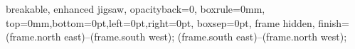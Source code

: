 
\usepackage[english]{babel}
\usepackage{lipsum}
\usepackage{blindtext}

\usepackage[many]{tcolorbox}
%
{%
    breakable,%
    enhanced jigsaw,%
    opacityback=0,%
    boxrule=0mm,%
    top=0mm,bottom=0pt,left=0pt,right=0pt,%
    boxsep=0pt,%
    frame hidden,%
    finish={%
         (frame.north east)--(frame.south west);%
         (frame.south east)--(frame.north west);%
    }%
}%
